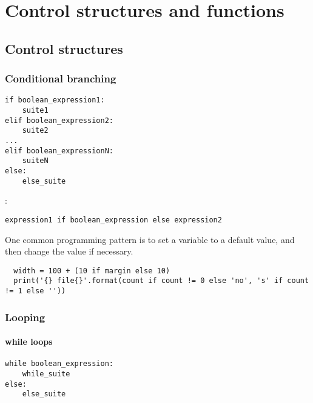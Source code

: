 
\chapter{Control structures and functions}

\section{Control structures}

\subsection{Conditional branching}
\begin{tcolorbox}
\begin{verbatim}
if boolean_expression1:
    suite1
elif boolean_expression2:
    suite2
...
elif boolean_expressionN:
    suiteN
else:
    else_suite
\end{verbatim}
  
\end{tcolorbox}



:
\begin{tcolorbox}
\begin{verbatim}
expression1 if boolean_expression else expression2
\end{verbatim}
  
\end{tcolorbox}

One common programming pattern is to set a variable to a default value, and then change the value if necessary.


\begin{lstlisting}
  width = 100 + (10 if margin else 10)
  print('{} file{}'.format(count if count != 0 else 'no', 's' if count != 1 else ''))
\end{lstlisting}

\subsection{Looping}

\subsubsection{while loops}

\begin{tcolorbox}
\begin{verbatim}
while boolean_expression:
    while_suite
else:
    else_suite
\end{verbatim}
  
\end{tcolorbox}


